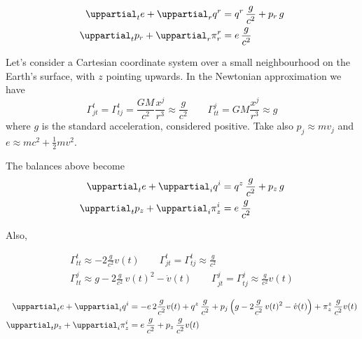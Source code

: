 \documentclass[\ifafour a4paper,12pt,\else a5paper,10pt,\fi%
onecolumn,oneside,article,%
british%
]{memoir}
\theoremstyle{remark}
\theoremstyle{innote}
\newcommand*{\de}{\uppartial}%
\renewcommand*{\|}[1][]{\nonscript\:#1\vert\nonscript\:\mathopen{}}
\newcommand*{\sect}{\S}%
\begin{document}
\begin{align}
  \label{eq:div_e_r_S}
  \de_{t}e + \de_{r}q^{r} &=
  q^{r}\, \frac{g}{c^{2}}
  +p_{r}\, g
  \\
  \label{eq:div_p_r_S}
  \de_{t}p_{r} +  \de_{r}\pi^{r}_{r} &=
  e\, \frac{g}{c^{2}}
\end{align}





Let's consider a Cartesian coordinate system over a small neighbourhood on the Earth's surface, with $z$ pointing upwards. In the Newtonian approximation we have \autocites[\sect\,5.2.3]{poissonetal2014}
\begin{equation}
  \label{eq:christof_newt}
  \varGamma^{t}_{jt}=\varGamma^{t}_{tj} =
    \frac{GM}{c^{2}}\frac{x^{j}}{r^{3}} \approx \frac{g}{c^{2}}
  \qquad\varGamma^{j}_{tt} = GM\frac{x^{j}}{r^{3}} \approx g
\end{equation}
where $g$ is the standard acceleration, considered positive. Take also $p_{j} \approx m v_{j}$ and $e\approx m c^{2} + \frac{1}{2}mv^{2}$.



The balances above become
\begin{align}
  \label{eq:div_e_appr}
  \de_{t}e + \de_{i}q^{i} &=
  q^{z}\, \frac{g}{c^{2}}
  +p_{z}\, g
  \\
  \label{eq:div_p_appr}
  \de_{t}p_{z} +  \de_{i}\pi^{i}_{z} &=
  e\,\frac{g}{c^{2}}
\end{align}

Also,

\begin{equation}
  \label{eq:christof_body}
  \begin{gathered}
    \varGamma^{t}_{tt} \approx
    -2\frac{g}{c^{2}} v(t)
    \qquad
    \varGamma^{t}_{jt}=\varGamma^{t}_{tj}
    \approx \frac{g}{c^{2}}
    \\
    \varGamma^{j}_{tt} \approx
    g - 2\frac{g}{c^{2}}\,v(t)^{2} - \dot{v}(t)
    \qquad
    \varGamma^{j}_{jt} = \varGamma^{j}_{tj} \approx
    \frac{g}{c^{2}} v(t)
  \end{gathered}
\end{equation}

\begin{align}
  \label{eq:div_e}
  \de_{t}e + \de_{i}q^{i} &=
  -e\,2\frac{g}{c^{2}} v(t)
  +q^{z}\, \frac{g}{c^{2}}
  +p_{j}\, \Bigl(g - 2\frac{g}{c^{2}}\,v(t)^{2} - \dot{v}(t)\Bigr)
  +\pi^{z}_{z}\, \frac{g}{c^{2}} v(t)
  \\
  \label{eq:div_p}
  \de_{t}p_{z} +  \de_{i}\pi^{i}_{z} &=
  e\, \frac{g}{c^{2}}
  +p_{z}\,\frac{g}{c^{2}} v(t)
\end{align}
\end{document}
